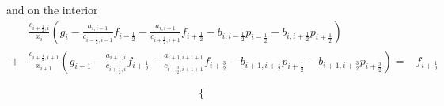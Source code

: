 \documentclass[12pt, english]{article}
\begin{document}
%
and on the interior
%
\begin{align*}
&\frac{c_{i+\frac12, i}}{x_i} \left( 
g_i - \frac{a_{i,i-1}}{c_{i-\frac12, i-1}}f_{i-\frac12}- \frac{a_{i,i+1}}{c_{i+\frac12, i+1}}f_{i+\frac12}
- b_{i,i-\frac12} p_{i-\frac12}   - b_{i,i+\frac12} p_{i+\frac12}
\right)  
\\+& \frac{c_{i+\frac12, i+1}}{x_{i+1}} \left( 
g_{i+1} - \frac{a_{i+1,i}}{c_{i+\frac12, i}}f_{i+\frac12}- \frac{a_{i+1,i+1+1}}{c_{i+\frac32, i+1+1}}f_{i+\frac32}
- b_{i+1,i+\frac12} p_{i+\frac12}   - b_{i+1,i+\frac32} p_{i+\frac32}
\right) =& f_{i+\frac12}
\end{align*}
%

\begin{equation}\label{eq:}
%
\left\{
\begin{aligned}
\end{aligned}
\right.
%
\end{equation}
%


\end{document}
